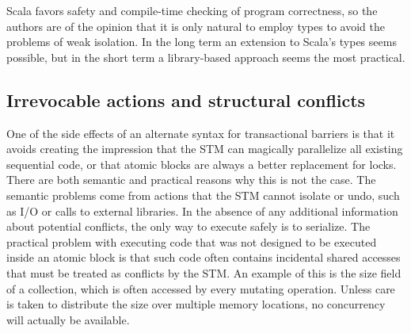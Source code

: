 Scala favors safety and compile-time checking of program correctness,
so the authors are of the opinion that it is only natural to employ types
to avoid the problems of weak isolation.  In the long term an extension
to Scala's types seems possible, but in the short term a library-based
approach seems the most practical.

\subsection{Irrevocable actions and structural conflicts}

One of the side effects of an alternate syntax for transactional barriers
is that it avoids creating the impression that the STM can magically
parallelize all existing sequential code, or that atomic blocks are
always a better replacement for locks.  There are both semantic and
practical reasons why this is not the case.  The semantic problems come
from actions that the STM cannot isolate or undo, such as I/O or calls to
external libraries.  In the absence of any additional information about
potential conflicts, the only way to execute safely is to serialize.
The practical problem with executing code that was not designed to
be executed inside an atomic block is that such code often contains
incidental shared accesses that must be treated as conflicts by the STM.
An example of this is the size field of a collection, which is often
accessed by every mutating operation.  Unless care is taken to distribute
the size over multiple memory locations, no concurrency will actually
be available.



